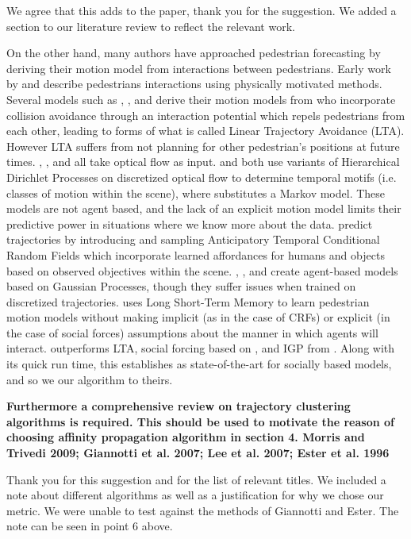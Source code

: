 \documentclass[usenames,dvipsnames]{article}
\providecommand{\response}[1]{
\noindent
\noindent\colorbox{gray!20}{
\parbox{\textwidth}{
\setlength{\parskip}{.1in}
\setlength{\parindent}{.1in}
#1}
}
}
\begin{document}
\begin{enumerate}
We agree that this adds to the paper, thank you for the suggestion. We added a section to our literature review to reflect the relevant work.

	\response{On the other hand, many authors have approached pedestrian forecasting by deriving their motion model from interactions between pedestrians. Early work by \cite{Helbing1995} and \cite{Xu2012} describe pedestrians interactions using physically motivated methods. Several models such as \cite{Yamaguchi2011}, \cite{Yi2016}, and \cite{Pellegrini2009} derive their motion models from \cite{Helbing1995} who incorporate collision avoidance through an interaction potential which repels pedestrians from each other, leading to forms of what is called Linear Trajectory Avoidance (LTA). However LTA suffers from not planning for other pedestrian’s positions at future times. \cite{Emonet2011}, \cite{Hospedales2009} , and \cite{Wang2009}  all take optical flow as input. \cite{Wang2009} and \cite{Emonet2011} both use variants of Hierarchical Dirichlet Processes on discretized optical flow to determine temporal motifs (i.e. classes of motion within the scene), where \cite{Hospedales2009} substitutes a Markov model. These models are not agent based, and the lack of an explicit motion model limits their predictive power in situations where we know more about the data. \cite{Koppula2016} predict trajectories by introducing and sampling Anticipatory Temporal Conditional Random Fields which incorporate learned affordances for humans and objects based on observed objectives within the scene. \cite{Tay2008} , \cite{Wang2008}, and \cite{Trautman2015} create agent-based models based on Gaussian Processes, though they suffer issues when trained on discretized trajectories. \cite{Alahi2016} uses Long Short-Term Memory to learn pedestrian motion models without making implicit (as in the case of CRFs) or explicit (in the case of social forces) assumptions about the manner in which agents will interact. \cite{Alahi2016} outperforms LTA, social forcing based on \cite{Yamaguchi2011},  and IGP from \cite{Trautman2015}. Along with its quick run time, this establishes \cite{Alahi2016} as state-of-the-art for socially based models, and so we our algorithm to theirs. }

\begin{item}
\textbf{Furthermore a comprehensive review on trajectory clustering algorithms
is required. This should be used to motivate the reason of choosing
affinity propagation algorithm in section 4. 
Morris and Trivedi 2009; Giannotti et al. 2007; Lee et al. 2007;
Ester et al. 1996 }

Thank you for this suggestion and for the list of relevant titles. We included a note about different algorithms as well as a justification for why we chose our metric. We were unable to test against the methods of Giannotti and Ester. The note can be seen in point 6 above. 

\end{item}
\end{enumerate}
\end{document}
